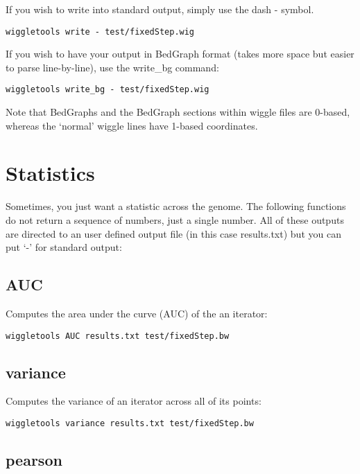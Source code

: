 \documentclass[12pt]{article}
\begin{document}
If you wish to write into standard output, simply use the dash - symbol.

\begin{verbatim}
wiggletools write - test/fixedStep.wig 
\end{verbatim}

If you wish to have your output in BedGraph format (takes more space but easier to parse line-by-line), use the write\_bg command:

\begin{verbatim}
wiggletools write_bg - test/fixedStep.wig 
\end{verbatim}

Note that BedGraphs and the BedGraph sections within wiggle files are 0-based, whereas the `normal' wiggle lines have 1-based coordinates.

\section{Statistics}

Sometimes, you just want a statistic across the genome. The following functions do not return a sequence of numbers, just a single number. All of these outputs are directed to an user defined output file (in this case results.txt) but you can put `-' for standard output:

\subsection{AUC}

Computes the area under the curve (AUC) of the an iterator:

\begin{verbatim}
wiggletools AUC results.txt test/fixedStep.bw
\end{verbatim}

\subsection{variance}

Computes the variance of an iterator across all of its points:

\begin{verbatim}
wiggletools variance results.txt test/fixedStep.bw 
\end{verbatim}

\subsection{pearson}
\end{document}
